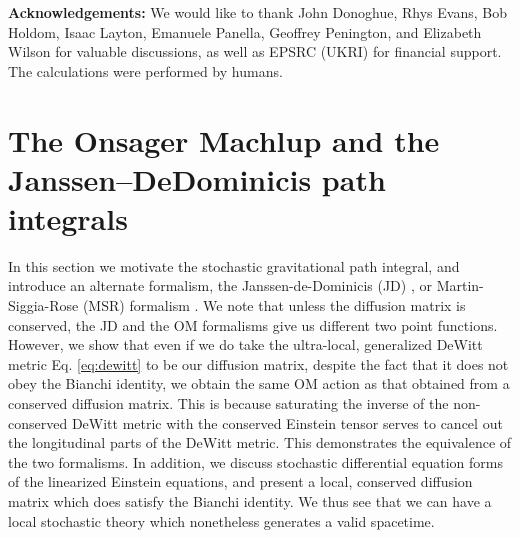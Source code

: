 \documentclass[aps,preprintnumbers,superscriptaddress,longbibliography]{revtex4-1}
\begin{document}
\noindent\textbf{ Acknowledgements:}
We would like to thank John Donoghue, Rhys Evans, Bob Holdom,  Isaac Layton, Emanuele Panella, Geoffrey Penington, and Elizabeth Wilson for valuable discussions, as well as EPSRC (UKRI) for financial support. The calculations were performed by humans.



 



\newpage
\appendix

\section{The Onsager Machlup and the Janssen–DeDominicis path integrals }
\label{sec:OMJD}

 In this section we motivate the stochastic gravitational path integral, and introduce an alternate formalism, the Janssen-de-Dominicis (JD) \cite{Janssen1976-hh},\cite{De_Dominicis1976-zy} or Martin-Siggia-Rose (MSR) formalism \cite{martin1973statistical}. We note that unless the diffusion matrix is conserved, the JD and the OM formalisms give us different two point functions. However, we show that even if we do take the ultra-local, generalized DeWitt metric Eq. \eqref{eq:dewitt} to be our diffusion matrix, despite the fact that it does not obey the Bianchi identity, we obtain the same OM action as that obtained from a conserved diffusion matrix. This is because saturating the inverse of the non-conserved DeWitt metric with the conserved Einstein tensor serves to cancel out the longitudinal parts of the DeWitt metric. 
 This demonstrates the equivalence of the two formalisms.
 In addition, we discuss stochastic differential equation forms of the linearized Einstein equations, and present a local, conserved diffusion matrix which does satisfy the Bianchi identity. We thus see that we can have a local stochastic theory which nonetheless generates a valid spacetime.
\end{document}
